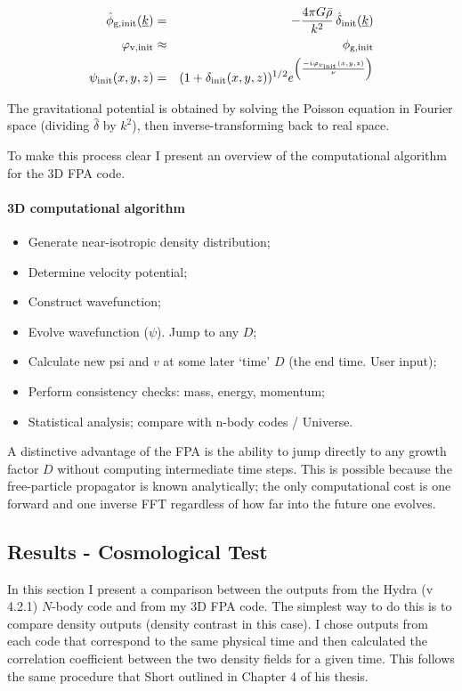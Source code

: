 \begin{eqnarray}
	\hat{\phi}_{\rm g,init}(\underline{k}) &=& -\frac{4 \pi G \bar{\rho}}{k^2}\,\hat{\delta}_{\rm init}(\underline{k}) \nonumber \\
	\varphi_{\rm v,init} &\approx& \phi_{\rm g,init} \nonumber \\
	\psi_{\rm init}(x,y,z) &=& (1+\delta_{\rm init}(x,y,z))^{1/2}e^{\left(\frac{-i\varphi_{v_{\rm init}}(x,y,z)}{\nu}\right)}
\end{eqnarray}

\noindent The gravitational potential is obtained by solving the Poisson equation in Fourier space (dividing $\hat{\delta}$ by $k^2$), then inverse-transforming back to real space.

To make this process clear I present an overview of the computational algorithm for the 3D FPA code.

\paragraph{3D computational algorithm}

\begin{itemize}
\item Generate near-isotropic density distribution;
\item Determine velocity potential;
\item Construct wavefunction;
\item Evolve wavefunction ($\psi$). Jump to any $D$;
\item Calculate new psi and $v$ at some later `time' $D$ (the end time. User input);
\item Perform consistency checks: mass, energy, momentum;
\item Statistical analysis; compare with n-body codes / Universe.
\end{itemize}

\noindent A distinctive advantage of the FPA is the ability to jump directly to any growth factor $D$ without computing intermediate time steps. This is possible because the free-particle propagator is known analytically; the only computational cost is one forward and one inverse FFT regardless of how far into the future one evolves.

\subsection{Results - Cosmological Test}
In this section I present a comparison between the outputs from the Hydra (v 4.2.1) $N$-body code and from my 3D FPA code. The simplest way to do this is to compare density outputs (density contrast in this case). I chose outputs from each code that correspond to the same physical time and then calculated the correlation coefficient between the two density fields for a given time. This follows the same procedure that Short outlined in Chapter 4 of his thesis.

